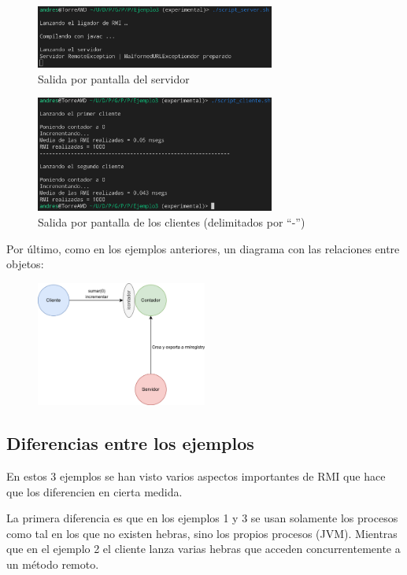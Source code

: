 \documentclass{article}
\begin{document}
\begin{figure}[H]
    \centering
    \includegraphics[width=0.7\textwidth]{imagenes/E3S1.png}
    \caption{Salida por pantalla del servidor}
\end{figure}

\begin{figure}[H]
    \centering
    \includegraphics[width=0.7\textwidth]{imagenes/E3C1.png}
    \caption{Salida por pantalla de los clientes (delimitados por ``-'')}
\end{figure}

Por último, como en los ejemplos anteriores, un diagrama con las relaciones entre objetos:

\begin{figure}[H]
    \centering
    \includegraphics[width=0.5\textwidth]{imagenes/E3Diagrama.png}
\end{figure}

\subsection{Diferencias entre los ejemplos}
En estos 3 ejemplos se han visto varios aspectos importantes de RMI que hace que los diferencien en cierta medida. 

La primera diferencia es que en los ejemplos 1 y 3 se usan solamente los procesos como tal en los que no existen hebras, sino los propios procesos (JVM). Mientras que en el ejemplo 2 el cliente lanza varias hebras que acceden concurrentemente a un método remoto.
\end{document}
